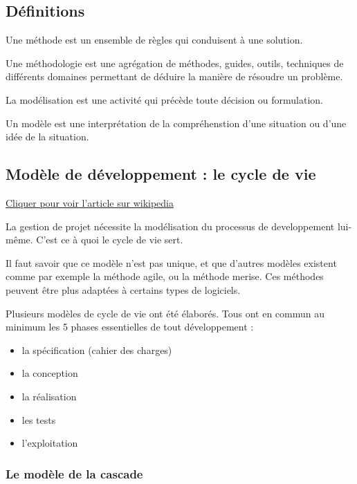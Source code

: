 \hypertarget{duxe9finitions}{%
\subsection{Définitions}\label{duxe9finitions}}

Une méthode est un ensemble de règles qui conduisent à une solution.

Une méthodologie est une agrégation de méthodes, guides, outils,
techniques de différents domaines permettant de déduire la manière de
résoudre un problème.

La modélisation est une activité qui précède toute décision ou
formulation.

Un modèle est une interprétation de la compréhenstion d'une situation ou
d'une idée de la situation.

\hypertarget{moduxe8le-de-duxe9veloppement-le-cycle-de-vie}{%
\subsection{Modèle de développement : le cycle de
vie}\label{moduxe8le-de-duxe9veloppement-le-cycle-de-vie}}

\href{https://fr.wikipedia.org/wiki/Cycle_de_d\%C3\%A9veloppement_(logiciel)}{Cliquer pour voir
l'article sur wikipedia}

La gestion de projet nécessite la modélisation du processus de
developpement lui-même. C'est ce à quoi le cycle de vie sert.

Il faut savoir que ce modèle n'est pas unique, et que d'autres modèles
existent comme par exemple la méthode agile, ou la méthode merise. Ces
méthodes peuvent être plus adaptées à certains types de logiciels.

Plusieurs modèles de cycle de vie ont été élaborés. Tous ont en commun
au minimum les 5 phases essentielles de tout développement :

\begin{itemize}
\tightlist
\item
  la spécification (cahier des charges)
\item
  la conception
\item
  la réalisation
\item
  les tests
\item
  l'exploitation
\end{itemize}

\hypertarget{le-moduxe8le-de-la-cascade}{%
\subsubsection{Le modèle de la
cascade}\label{le-moduxe8le-de-la-cascade}}

